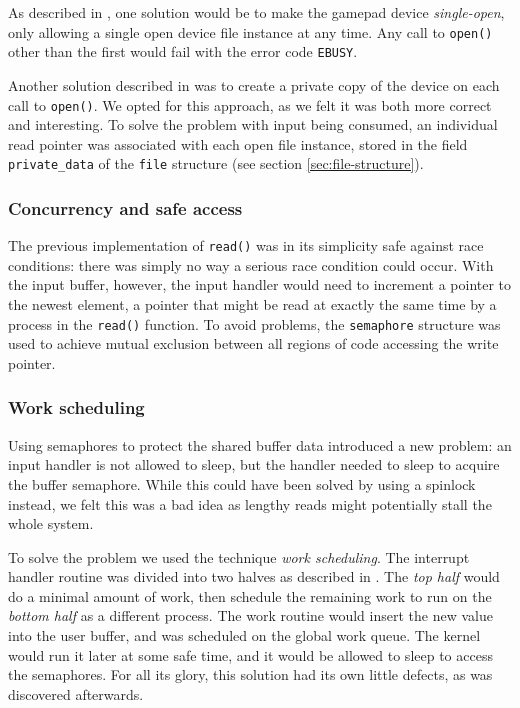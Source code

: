 As described in \cite{linux-device-drivers}, one solution would be to make the gamepad device \emph{single-open}, only allowing a single open device file instance at any time. Any call to \texttt{open()} other than the first would fail with the error code \texttt{EBUSY}.

Another solution described in \cite{linux-device-drivers} was to create a private copy of the device on each call to \texttt{open()}. We opted for this approach, as we felt it was both more correct and interesting. To solve the problem with input being consumed, an individual read pointer was associated with each open file instance, stored in the field \texttt{private\_data} of the \texttt{file} structure (see section \ref{sec:file-structure}).

\subsubsection{Concurrency and safe access}
The previous implementation of \texttt{read()} was in its simplicity safe against race conditions: there was simply no way a serious race condition could occur. With the input buffer, however, the input handler would need to increment a pointer to the newest element, a pointer that might be read at exactly the same time by a process in the \texttt{read()} function. To avoid problems, the \texttt{semaphore} structure was used to achieve mutual exclusion between all regions of code accessing the write pointer.

\subsubsection{Work scheduling}
Using semaphores to protect the shared buffer data introduced a new problem: an input handler is not allowed to sleep, but the handler needed to sleep to acquire the buffer semaphore. While this could have been solved by using a spinlock instead, we felt this was a bad idea as lengthy reads might potentially stall the whole system.

To solve the problem we used the technique \emph{work scheduling}. The interrupt handler routine was divided into two halves as described in \cite{linux-device-drivers}. The \emph{top half} would do a minimal amount of work, then schedule the remaining work to run on the \emph{bottom half} as a different process. The work routine would insert the new value into the user buffer, and was scheduled on the global work queue. The kernel would run it later at some safe time, and it would be allowed to sleep to access the semaphores. For all its glory, this solution had its own little defects, as was discovered afterwards. 

